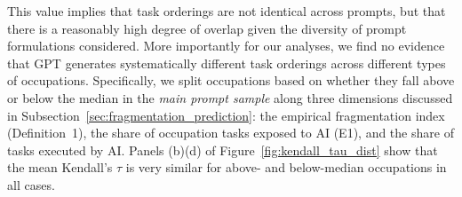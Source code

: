 This value implies that task orderings are not identical across prompts, but that there is a reasonably high degree of overlap given the diversity of prompt formulations considered.
More importantly for our analyses, we find no evidence that GPT generates systematically different task orderings across different types of occupations.
Specifically, we split occupations based on whether they fall above or below the median in the \emph{main prompt sample} along three dimensions discussed in Subsection~\ref{sec:fragmentation_prediction}: the empirical fragmentation index (Definition~1), the share of occupation tasks exposed to AI (E1), and the share of tasks executed by AI.
Panels (b)\textendash(d) of Figure~\ref{fig:kendall_tau_dist} show that the mean Kendall's $\tau$ is very similar for above- and below-median occupations in all cases.

